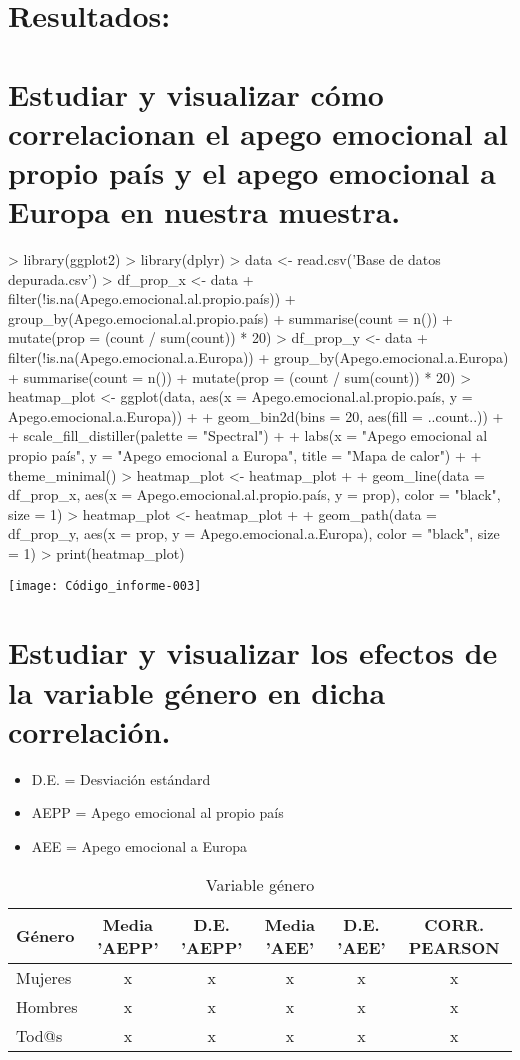 \documentclass{article}
\begin{document}
\section*{Resultados:}

\section{Estudiar y visualizar cómo correlacionan el apego emocional al propio país y el apego emocional a Europa en nuestra muestra.}

\begin{Schunk}
\begin{Sinput}
> library(ggplot2)
> library(dplyr)
> data <- read.csv('Base de datos depurada.csv')
> df_prop_x <- data %>%
+   filter(!is.na(Apego.emocional.al.propio.país)) %>%
+   group_by(Apego.emocional.al.propio.país) %>%
+   summarise(count = n()) %>%
+   mutate(prop = (count / sum(count)) * 20)
> df_prop_y <- data %>%
+   filter(!is.na(Apego.emocional.a.Europa)) %>%
+   group_by(Apego.emocional.a.Europa) %>%
+   summarise(count = n()) %>%
+   mutate(prop = (count / sum(count)) * 20)
> heatmap_plot <- ggplot(data, aes(x = Apego.emocional.al.propio.país, y = Apego.emocional.a.Europa)) +
+   geom_bin2d(bins = 20, aes(fill = ..count..)) +
+   scale_fill_distiller(palette = "Spectral") +
+   labs(x = "Apego emocional al propio país", y = "Apego emocional a Europa", title = "Mapa de calor") +
+   theme_minimal()
> heatmap_plot <- heatmap_plot +
+   geom_line(data = df_prop_x, aes(x = Apego.emocional.al.propio.país, y = prop), color = "black", size = 1)
> heatmap_plot <- heatmap_plot +
+   geom_path(data = df_prop_y, aes(x = prop, y = Apego.emocional.a.Europa), color = "black", size = 1)
> print(heatmap_plot)
\end{Sinput}
\end{Schunk}
\texttt{[image: Código\_informe-003]}

\section{Estudiar y visualizar los efectos de la variable género en dicha correlación.}
 \begin{itemize}
 \item D.E. = Desviación estándard
 \item AEPP = Apego emocional al propio país
 \item AEE = Apego emocional a Europa
 \end{itemize}
 \begin{table}[h!]
 \caption{Variable género}
 \begin{tabular}{l | c c c c c}
 \hline
 \bf{Género} & \bf{Media 'AEPP'} & \bf{D.E. 'AEPP'} & \bf{Media 'AEE'} & \bf{D.E. 'AEE'} & \bf{CORR. PEARSON} \\
 \hline
 Mujeres & x & x & x & x & x \\
 Hombres & x & x & x & x & x \\
 Tod@s & x & x & x & x & x \\
 \hline
 \end{tabular}
 \end{table}
\end{document}
